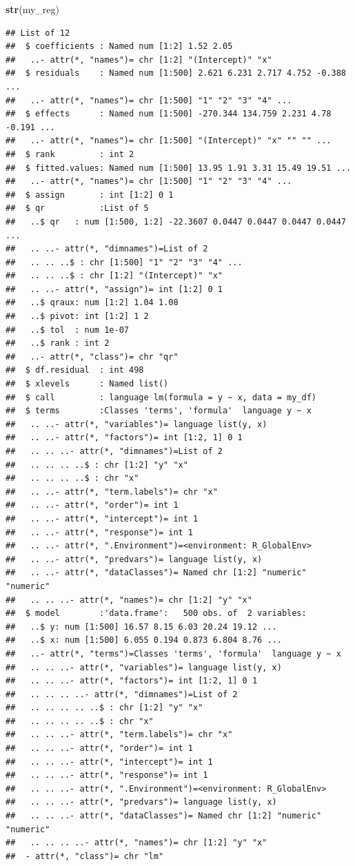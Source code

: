 \documentclass[]{book}
\newenvironment{Shaded}{\begin{snugshade}}{\end{snugshade}}
\newcommand{\KeywordTok}[1]{\textcolor[rgb]{0.13,0.29,0.53}{\textbf{#1}}}
\newcommand{\NormalTok}[1]{#1}
\theoremstyle{definition}
\theoremstyle{definition}
\theoremstyle{definition}
\theoremstyle{remark}
\begin{document}
\begin{Shaded}
\begin{Highlighting}[]
\KeywordTok{str}\NormalTok{(my_reg)}
\end{Highlighting}
\end{Shaded}

\begin{verbatim}
## List of 12
##  $ coefficients : Named num [1:2] 1.52 2.05
##   ..- attr(*, "names")= chr [1:2] "(Intercept)" "x"
##  $ residuals    : Named num [1:500] 2.621 6.231 2.717 4.752 -0.388 ...
##   ..- attr(*, "names")= chr [1:500] "1" "2" "3" "4" ...
##  $ effects      : Named num [1:500] -270.344 134.759 2.231 4.78 -0.191 ...
##   ..- attr(*, "names")= chr [1:500] "(Intercept)" "x" "" "" ...
##  $ rank         : int 2
##  $ fitted.values: Named num [1:500] 13.95 1.91 3.31 15.49 19.51 ...
##   ..- attr(*, "names")= chr [1:500] "1" "2" "3" "4" ...
##  $ assign       : int [1:2] 0 1
##  $ qr           :List of 5
##   ..$ qr   : num [1:500, 1:2] -22.3607 0.0447 0.0447 0.0447 0.0447 ...
##   .. ..- attr(*, "dimnames")=List of 2
##   .. .. ..$ : chr [1:500] "1" "2" "3" "4" ...
##   .. .. ..$ : chr [1:2] "(Intercept)" "x"
##   .. ..- attr(*, "assign")= int [1:2] 0 1
##   ..$ qraux: num [1:2] 1.04 1.08
##   ..$ pivot: int [1:2] 1 2
##   ..$ tol  : num 1e-07
##   ..$ rank : int 2
##   ..- attr(*, "class")= chr "qr"
##  $ df.residual  : int 498
##  $ xlevels      : Named list()
##  $ call         : language lm(formula = y ~ x, data = my_df)
##  $ terms        :Classes 'terms', 'formula'  language y ~ x
##   .. ..- attr(*, "variables")= language list(y, x)
##   .. ..- attr(*, "factors")= int [1:2, 1] 0 1
##   .. .. ..- attr(*, "dimnames")=List of 2
##   .. .. .. ..$ : chr [1:2] "y" "x"
##   .. .. .. ..$ : chr "x"
##   .. ..- attr(*, "term.labels")= chr "x"
##   .. ..- attr(*, "order")= int 1
##   .. ..- attr(*, "intercept")= int 1
##   .. ..- attr(*, "response")= int 1
##   .. ..- attr(*, ".Environment")=<environment: R_GlobalEnv> 
##   .. ..- attr(*, "predvars")= language list(y, x)
##   .. ..- attr(*, "dataClasses")= Named chr [1:2] "numeric" "numeric"
##   .. .. ..- attr(*, "names")= chr [1:2] "y" "x"
##  $ model        :'data.frame':   500 obs. of  2 variables:
##   ..$ y: num [1:500] 16.57 8.15 6.03 20.24 19.12 ...
##   ..$ x: num [1:500] 6.055 0.194 0.873 6.804 8.76 ...
##   ..- attr(*, "terms")=Classes 'terms', 'formula'  language y ~ x
##   .. .. ..- attr(*, "variables")= language list(y, x)
##   .. .. ..- attr(*, "factors")= int [1:2, 1] 0 1
##   .. .. .. ..- attr(*, "dimnames")=List of 2
##   .. .. .. .. ..$ : chr [1:2] "y" "x"
##   .. .. .. .. ..$ : chr "x"
##   .. .. ..- attr(*, "term.labels")= chr "x"
##   .. .. ..- attr(*, "order")= int 1
##   .. .. ..- attr(*, "intercept")= int 1
##   .. .. ..- attr(*, "response")= int 1
##   .. .. ..- attr(*, ".Environment")=<environment: R_GlobalEnv> 
##   .. .. ..- attr(*, "predvars")= language list(y, x)
##   .. .. ..- attr(*, "dataClasses")= Named chr [1:2] "numeric" "numeric"
##   .. .. .. ..- attr(*, "names")= chr [1:2] "y" "x"
##  - attr(*, "class")= chr "lm"
\end{verbatim}
\end{document}
